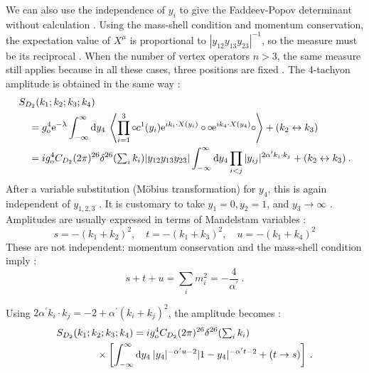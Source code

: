 We can also use the independence of $y_{i}$ to give the Faddeev-Popov determinant without calculation . Using the mass-shell condition and momentum conservation, the expectation value of $X^{\mu}$ is proportional to $|y_{12} y_{13} y_{23}|^{-1}$, so the measure must be its reciprocal . When the number of vertex operators $n>3$, the same measure still applies because in all these cases, three positions are fixed . The 4-tachyon amplitude is obtained in the same way :
\begin{align}
	&S_{D_{2}}(k_{1} ; k_{2} ; k_{3} ; k_{4}) \nonumber \\
	&\quad =g_{\mathrm{o}}^{4} \mathrm{e}^{-\lambda} \int_{-\infty}^{\infty} \mathrm{d} y_{4}\:
	\left\langle\prod_{i=1}^{3} \circ\mkern-1mu c^{1}(y_{i}) \mathrm{e}^{i k_{i} \cdot X(y_{i})}\circ\mkern-1mu 
	\circ\mkern-1mu \mathrm{e}^{i k_{4} \cdot X(y_{4})}\circ\mkern-1mu \right\rangle +(k_{2} \leftrightarrow k_{3}) \nonumber \\
	&\quad =i g_{\mathrm{o}}^{4} C_{D_{2}}(2 \pi)^{26} \delta^{26}({\textstyle\sum_{i} k_{i}})|y_{12} y_{13} y_{23}|
	\int_{-\infty}^{\infty} \mathrm{d} y_{4} \prod_{i<j}|y_{i j}|^{2 \alpha^{\prime} k_{i} \cdot k_{j}} +(k_{2} \leftrightarrow k_{3}) \:. \label{6.4.5}
\end{align}
After a variable substitution (Möbius transformation) for $y_{4}$, this is again independent of $y_{1,2,3}$ . It is customary to take $y_{1}=0, y_{2}=1$, and $y_{3} \rightarrow \infty$ . Amplitudes are usually expressed in terms of Mandelstam variables :
\begin{equation}
	s=-(k_{1}+k_{2})^{2}, \quad t=-(k_{1}+k_{3})^{2}, \quad u=-(k_{1}+k_{4})^{2} \label{6.4.6}
\end{equation}
These are not independent: momentum conservation and the mass-shell condition imply :
\begin{equation}
	s+t+u=\sum_{i} m_{i}^{2}=-\frac{4}{\alpha^{\prime}} \:. \label{6.4.7}
\end{equation}

\noindent Using $2 \alpha^{\prime} k_{i} \cdot k_{j}=-2+\alpha^{\prime}(k_{i}+k_{j})^{2}$, the amplitude becomes :
\begin{align}
	&S_{D_{2}}(k_{1} ; k_{2}; k_{3} ; k_{4}) = i  g_{\mathrm{o}}^{4} C_{D_{2}}(2 \pi)^{26} \delta^{26}({\textstyle\sum_{i} k_{i}})
	\nonumber \\
	&\qquad \qquad \times\left[\int_{-\infty}^{\infty} \mathrm{d} y_{4}\: |y_{4}|^{-\alpha^{\prime} u-2}|1-y_{4}|^{-\alpha^{\prime} t-2}
	+(t \rightarrow s)\right] \:. \label{6.4.8}
\end{align}


